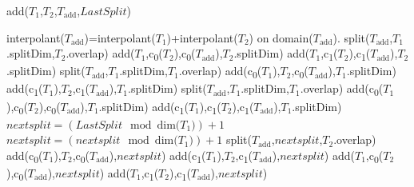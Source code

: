 \documentclass{article}
\newcommand{\child}[1]{c\textsubscript{#1}}
\begin{document}
\begin{algorithm}[!h]
\caption{add($T_1$,$T_2$,$T_{\mbox{add}}$,$LastSplit$)}
\label{addition3}
\begin{algorithmic}
\STATE interpolant($T_{\mbox{add}}$)=interpolant($T_1$)+interpolant($T_2$) on domain($T_{\mbox{add}}$).
\STATE split($T_{\mbox{add}}$,$T_1$.splitDim,$T_2$.overlap)
\STATE add($T_1$,\child{0}($T_2$),\child{0}($T_{\mbox{add}}$),$T_2$.splitDim)
\STATE add($T_1$,\child{1}($T_2$),\child{1}($T_{\mbox{add}}$),$T_2$.splitDim)
\STATE split($T_{\mbox{add}}$,$T_1$.splitDim,$T_1$.overlap)
\STATE add(\child{0}($T_1$),$T_2$,\child{0}($T_{\mbox{add}}$),$T_1$.splitDim)
\STATE add(\child{1}($T_1$),$T_2$,\child{1}($T_{\mbox{add}}$),$T_1$.splitDim)
\STATE split($T_{\mbox{add}}$,$T_1$.splitDim,$T_1$.overlap)
\STATE add(\child{0}($T_1$),\child{0}($T_2$),\child{0}($T_{\mbox{add}}$),$T_1$.splitDim)
\STATE add(\child{1}($T_1$),\child{1}($T_2$),\child{1}($T_{\mbox{add}}$),$T_1$.splitDim)
\ELSE
\STATE $nextsplit=(LastSplit \mod \text{dim($T_1$)}) +1$
\STATE $nextsplit=(nextsplit \mod \text{dim($T_1$)}) +1$
\ENDWHILE
\STATE split($T_{\mbox{add}}$,$nextsplit$,$T_2$.overlap)
\STATE add(\child{0}($T_1$),$T_2$,\child{0}($T_{\mbox{add}}$),$nextsplit$)
\STATE add(\child{1}($T_1$),$T_2$,\child{1}($T_{\mbox{add}}$),$nextsplit$)
\ELSE
\STATE add($T_1$,\child{0}($T_2$),\child{0}($T_{\mbox{add}}$),$nextsplit$)
\STATE add($T_1$,\child{1}($T_2$),\child{1}($T_{\mbox{add}}$),$nextsplit$)
\ENDIF
\ENDIF
\end{algorithmic}
\end{algorithm}



\end{document}
